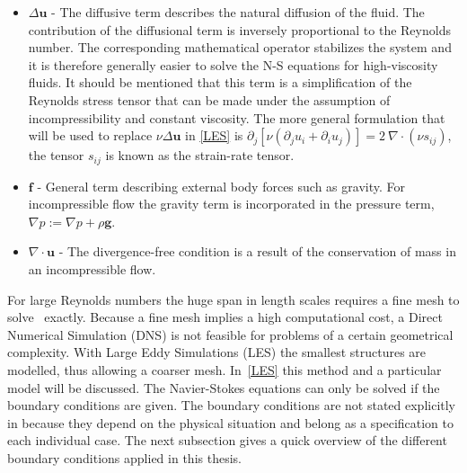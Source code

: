 \begin{itemize}
    \item $\Delta \mathbf{u}$ 
    - The diffusive term describes the natural diffusion of the fluid. The contribution of the diffusional term 
    is inversely proportional to the Reynolds number.
    The corresponding mathematical operator stabilizes the system and it is therefore generally easier
    to solve the N-S equations for high-viscosity fluids. It should be mentioned that this term is a simplification 
    of the Reynolds stress tensor that can be made under the assumption of incompressibility and constant viscosity.
    The more general formulation that will be used to replace $\nu\Delta\mathbf{u}$ in \cref{LES} is
    $\partial_j \left[  \nu(\partial_j u_i + \partial_i u_j)\right] = 2\: \nabla \cdot(\nu s_{ij})$,
    the tensor $s_{ij}$ is known as the strain-rate tensor. 

\item $\mathbf{f}$ 
    - General term describing external body forces such as gravity. For incompressible flow the
    gravity term is incorporated in the pressure term, $\nabla p := \nabla p + \rho \mathbf{g}$. 

    \item $\nabla \cdot \mathbf{u}$ 
    - The divergence-free condition is a result of the conservation of mass in an incompressible flow.
\end{itemize}
For large Reynolds numbers the huge span in length scales requires a fine mesh 
to solve~ exactly.
Because a fine mesh implies a high computational cost, a Direct Numerical Simulation (DNS) is not feasible for 
problems of a certain geometrical complexity. 
With Large Eddy Simulations (LES) the smallest structures are modelled, thus allowing a coarser mesh. 
In~\cref{LES} this method and a particular model will be discussed. 
The Navier-Stokes equations can only be solved if the boundary conditions are given. 
The boundary conditions are not stated explicitly in  because they depend on the physical 
situation and belong as a specification to each individual case. The next subsection gives a quick overview of the different 
boundary conditions applied in this thesis.
%
